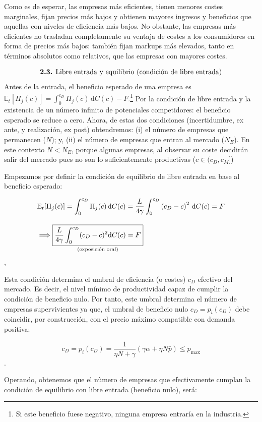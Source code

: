 \documentclass[10pt,a4paper]{article}
\begin{document}
Como es de esperar, las empresas más eficientes, tienen menores costes marginales, fijan precios más bajos y obtienen mayores ingresos y beneficios que aquellas con niveles de eficiencia más bajos. No obstante, las empresas más eficientes no trasladan completamente su ventaja de costes a los consumidores en forma de precios más bajos: también fijan markups más elevados, tanto en términos absolutos como relativos, que las empresas con mayores costes.

$$\text{\textbf{2.3.} Libre entrada y equilibrio (condición de libre entrada)}$$
Antes de la entrada, el beneficio esperado de una empresa es $\mathbb E_t[\Pi_j (c)]=\int_0^{c_D} \Pi_j(c)\, \mathrm dC(c) - F$.\footnote{Si este beneficio fuese negativo, ninguna empresa entraría en la industria.
} Por la condición de libre entrada y la existencia de un número infinito de potenciales competidores: el beneficio esperado se reduce a cero. Ahora, de estas dos condiciones (incertidumbre, ex ante, y realización, ex post) obtendremos: (i) el número de empresas que permanecen ($N$); y, (ii) el número de empresas que entran al mercado ($N_E$). En este contexto $N<N_E$, porque algunas empresas, al observar su coste decidirán salir del mercado pues no son lo suficientemente productivas ($c\in(c_D,c_M]$) 

Empezamos por definir la condición de equilibrio de libre entrada en base al beneficio esperado:

$$\begin{aligned}
    &\mathbb E_t[\Pi_j(c)]=\int_0^{c_D} \Pi_j(c)\, \mathrm dC(c) = \frac{L}{4\gamma} \int_0^{c_D} \left(c_D - c\right)^2 \, \mathrm dC(c) = F\\[1em]
    &\Longrightarrow\underset{\text{\scriptsize (exposición oral)}}{\boxed{\frac{L}{4\gamma}\int_0^{c_D}(c_D-c)^2\mathrm dC(c)=F}}
\end{aligned}$$,

Esta condición determina el umbral de eficiencia (o costes) $c_D$ efectivo del mercado. Es decir, el nivel mínimo de productividad capaz de cumplir la condición de beneficio nulo. Por tanto, este umbral determina el número de empresas supervivientes ya que, el umbral de beneficio nulo $c_D = p_i(c_D)$ debe coincidir, por construcción, con el precio máximo compatible con demanda positiva:

$$c_D = p_i(c_D) = \frac{1}{\eta N + \gamma}(\gamma \alpha + \eta N \bar{p})\leq p_{\max}$$.

Operando, obtenemos que el nùmero de empresas que efectivamente cumplan la condición de equilibrio con libre entrada (beneficio nulo), será:
\end{document}
